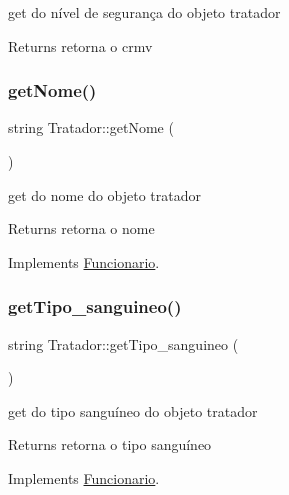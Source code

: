 get do nível de segurança do objeto tratador 

\begin{DoxyReturn}{Returns}
retorna o crmv 
\end{DoxyReturn}
\mbox{\label{class_tratador_a6bdd38bbc9d8805d75d374de88c0c8d5}} 
\subsubsection{\texorpdfstring{getNome()}{getNome()}}
{\footnotesize\ttfamily string Tratador\+::get\+Nome (\begin{DoxyParamCaption}{ }\end{DoxyParamCaption})\hspace{0.3cm}{\ttfamily [virtual]}}



get do nome do objeto tratador 

\begin{DoxyReturn}{Returns}
retorna o nome 
\end{DoxyReturn}


Implements \mbox{\hyperlink{class_funcionario}{Funcionario}}.

\mbox{\label{class_tratador_acd0df11ea6d1bea241e587c5e9864913}} 
\subsubsection{\texorpdfstring{getTipo\_sanguineo()}{getTipo\_sanguineo()}}
{\footnotesize\ttfamily string Tratador\+::get\+Tipo\+\_\+sanguineo (\begin{DoxyParamCaption}{ }\end{DoxyParamCaption})\hspace{0.3cm}{\ttfamily [virtual]}}



get do tipo sanguíneo do objeto tratador 

\begin{DoxyReturn}{Returns}
retorna o tipo sanguíneo 
\end{DoxyReturn}


Implements \mbox{\hyperlink{class_funcionario}{Funcionario}}.

